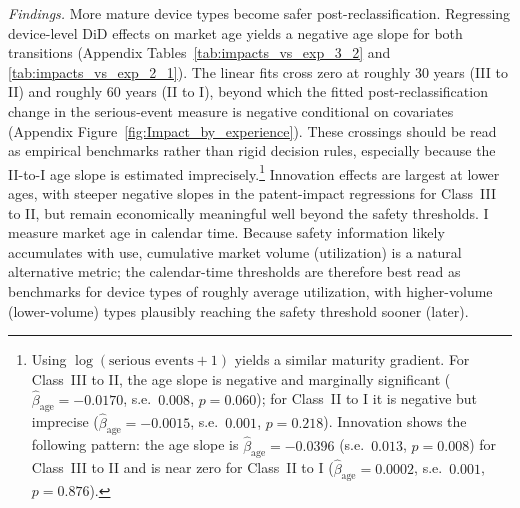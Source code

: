 \documentclass[letterpaper,12pt]{article}
\theoremstyle{definition}
\begin{document}
\textit{Findings.} More mature device types become safer post-reclassification. Regressing device-level DiD effects on market age yields a negative age slope for both transitions (Appendix Tables~\ref{tab:impacts_vs_exp_3_2} and \ref{tab:impacts_vs_exp_2_1}). The linear fits cross zero at roughly 30 years (III to II) and roughly 60 years (II to I), beyond which the fitted post-reclassification change in the serious-event measure is negative conditional on covariates (Appendix Figure~\ref{fig:Impact_by_experience}). These crossings should be read as empirical benchmarks rather than rigid decision rules, especially because the II-to-I age slope is estimated imprecisely.\footnote{Using $\log(\text{serious events}+1)$ yields a similar maturity gradient. For Class~III to II, the age slope is negative and marginally significant ($\hat\beta_{\text{age}}=-0.0170$, s.e.\ $0.008$, $p=0.060$); for Class~II to I it is negative but imprecise ($\hat\beta_{\text{age}}=-0.0015$, s.e.\ $0.001$, $p=0.218$). Innovation shows the following pattern: the age slope is $\hat\beta_{\text{age}}=-0.0396$ (s.e.\ $0.013$, $p=0.008$) for Class~III to II and is near zero for Class~II to I ($\hat\beta_{\text{age}}=0.0002$, s.e.\ $0.001$, $p=0.876$).} Innovation effects are largest at lower ages, with steeper negative slopes in the patent-impact regressions for Class~III to II, but remain economically meaningful well beyond the safety thresholds. I measure market age in calendar time. Because safety information likely accumulates with use, cumulative market volume (utilization) is a natural alternative metric; the calendar-time thresholds are therefore best read as benchmarks for device types of roughly average utilization, with higher-volume (lower-volume) types plausibly reaching the safety threshold sooner (later).
\end{document}
